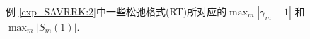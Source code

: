 \documentclass[aspectratio=169]{beamer}
\numberwithin{theorem}{section} %
\numberwithin{equation}{section}%
\numberwithin{figure}{section}%
\numberwithin{table}{section}%
\begin{document}
\begin{frame}%
	\begin{figure}[H]
		\begin{center}
		\caption{例 \ref{exp_SAVRRK:2}中一些松弛格式(RT)所对应的$\max_m\left|\gamma_m-1\right|$ 和 $\max_m\left|S_m(1)\right|$.}
		\label{fig_SAVRRK:2-1}
		\end{center}
		\end{figure}
\end{frame}
\end{document}
